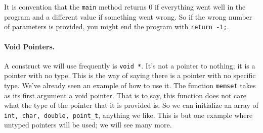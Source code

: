 It is convention that the \texttt{main} method returns 0 if everything went well in the program and a different value if something went wrong. So if the wrong number of parameters is provided, you might end the program with \texttt{return -1;}.



\paragraph{Void Pointers.}

A construct we will use frequently is \texttt{void *}. It's not a pointer to nothing; it is a pointer with no type. This is the way of saying there is a pointer with no specific type. We've already seen an example of how to use it. The function \texttt{memset} takes as its first argument a void pointer. That is to say, this function does not care what the type of the pointer that it is provided is. So we can initialize an array of \texttt{int, char, double, point\_t}, anything we like. This is but one example where untyped pointers will be used; we will see many more.





